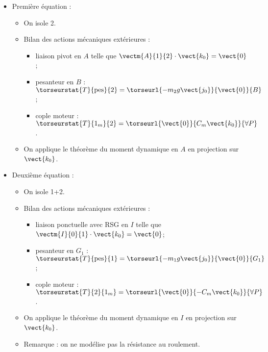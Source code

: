 \begin{itemize}
\item Première équation : 
\begin{itemize}
\item On isole 2.
\item Bilan des actions mécaniques extérieures :
\begin{itemize}
\item liaison pivot en $A$ telle que $\vectm{A}{1}{2}\cdot \vect{k_0} = \vect{0}$;
\item pesanteur en $B$ : $\torseurstat{T}{\text{pes}}{2} = \torseurl{-m_2 g \vect{j_0}}{\vect{0}}{B}$;
\item cople moteur : $\torseurstat{T}{1_m}{2} = \torseurl{\vect{0}}{C_m\vect{k_0}}{\forall P}$.
\end{itemize}
\item On applique le théorème du moment dynamique en $A$ en projection sur $\vect{k_0}$.
\end{itemize}
\item Deuxième équation : 
\begin{itemize}
\item On isole 1+2.
\item Bilan des actions mécaniques extérieures :
\begin{itemize}
\item liaison ponctuelle avec RSG en $I$ telle que $\vectm{I}{0}{1}\cdot \vect{k_0} = \vect{0}$; 
\item pesanteur en $G_1$  : $\torseurstat{T}{\text{pes}}{1} = \torseurl{-m_1 g \vect{j_0}}{\vect{0}}{G_1}$;
\item cople moteur : $\torseurstat{T}{2}{1_m} = \torseurl{\vect{0}}{-C_m\vect{k_0}}{\forall P}$.
\end{itemize}
\item On applique le théorème du moment dynamique en $I$ en projection sur $\vect{k_0}$.
\item Remarque : on ne modélise pas la résistance au roulement. 
\end{itemize}

\end{itemize}
\else
\fi



\ifcolle
{}
\else
\fi

\ifprof
\else


\fi